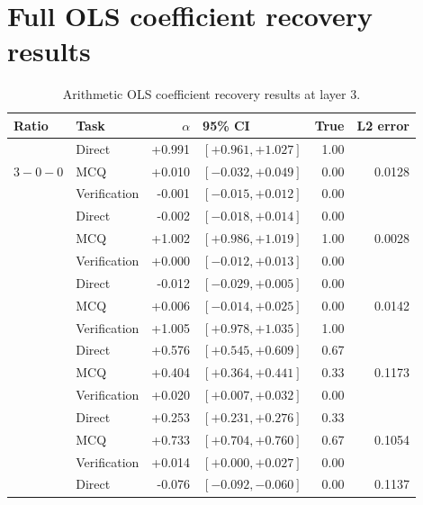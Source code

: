 \documentclass[11pt]{article}
\begin{document}
\section{Full OLS coefficient recovery results}
\label{appendix:ols_results}

\begin{table}[H]
\centering
\scriptsize
\renewcommand{\arraystretch}{1.25}
\caption{Arithmetic OLS coefficient recovery results at layer 3.}
\label{tab:ols_arithmetic_results}
\begin{tabular}{llrlrr}
\toprule
\textbf{Ratio} & \textbf{Task} & \textbf{\(\alpha\)} & \textbf{95\% CI} & \textbf{True} & \textbf{L2 error} \\
\midrule
\multirow{3}{*}{\(3-0-0\)} & Direct & +0.991 & \([+0.961,+1.027]\) & 1.00 & \multirow{3}{*}{0.0128} \\
 & MCQ & +0.010 & \([-0.032,+0.049]\) & 0.00 & \\
 & Verification & -0.001 & \([-0.015,+0.012]\) & 0.00 & \\
\addlinespace
\multirow{3}{*}{\(0-3-0\)} & Direct & -0.002 & \([-0.018,+0.014]\) & 0.00 & \multirow{3}{*}{0.0028} \\
 & MCQ & +1.002 & \([+0.986,+1.019]\) & 1.00 & \\
 & Verification & +0.000 & \([-0.012,+0.013]\) & 0.00 & \\
\addlinespace
\multirow{3}{*}{\(0-0-3\)} & Direct & -0.012 & \([-0.029,+0.005]\) & 0.00 & \multirow{3}{*}{0.0142} \\
 & MCQ & +0.006 & \([-0.014,+0.025]\) & 0.00 & \\
 & Verification & +1.005 & \([+0.978,+1.035]\) & 1.00 & \\
\addlinespace
\multirow{3}{*}{\(2-1-0\)} & Direct & +0.576 & \([+0.545,+0.609]\) & 0.67 & \multirow{3}{*}{0.1173} \\
 & MCQ & +0.404 & \([+0.364,+0.441]\) & 0.33 & \\
 & Verification & +0.020 & \([+0.007,+0.032]\) & 0.00 & \\
\addlinespace
\multirow{3}{*}{\(1-2-0\)} & Direct & +0.253 & \([+0.231,+0.276]\) & 0.33 & \multirow{3}{*}{0.1054} \\
 & MCQ & +0.733 & \([+0.704,+0.760]\) & 0.67 & \\
 & Verification & +0.014 & \([+0.000,+0.027]\) & 0.00 & \\
\addlinespace
\multirow{3}{*}{\(0-2-1\)} & Direct & -0.076 & \([-0.092,-0.060]\) & 0.00 & \multirow{3}{*}{0.1137} \\

\end{tabular}
\end{table}
\end{document}
